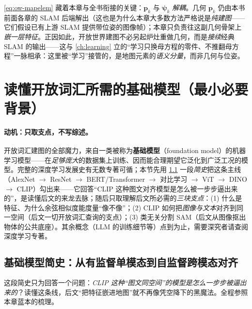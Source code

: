 \begin{insight}
\cref{eq:ow-mapelem} 藏着本章与全书衔接的关键：$\mathbf{p}_k$ 与 $\boldsymbol\psi_k$ \emph{解耦}。几何 $\mathbf{p}_k$ 仍由本书前面各章的 SLAM 后端解出（这也是为什么本章大多数方法严格说是\emph{纯建图}——它们假设已有上游 SLAM 提供带位姿的图像帧）；本章只负责往这副几何骨架上\emph{嵌一层特征}。正因如此，开放世界建图不必另起炉灶重做几何，而是\emph{接续}经典 SLAM 的输出——这与 \cref{ch:learning} 立的“学习只换母方程的零件、不推翻母方程”一脉相承：这里被“学习”接管的，是地图元素的\emph{语义分量}，而非几何与位姿。
\end{insight}

\section{读懂开放词汇所需的基础模型（最小必要背景）}
\label{sec:openworld-fm}

\paragraph{动机：只取支点，不写综述。}
开放词汇建图的全部魔力，来自一类被称为\textbf{基础模型}（foundation model）的机器学习模型——在\emph{足够庞大}的数据集上训练、因而能合理期望它泛化到广泛工况的模型\cite{paull2026openworld}。完整的深度学习发展史有无数专著可循；本节先用 \cref{sec:openworld-fmhistory} 一段\emph{简史}把这条主线（AlexNet $\to$ ResNet $\to$ BERT/Transformer $\to$ 对比学习 $\to$ ViT $\to$ DINO $\to$ CLIP）勾出来——它回答“CLIP 这种图文对齐模型是怎么被一步步逼出来的”，是读懂后文的来龙去脉；随后只取理解后文所必需的\emph{三块支点}：(1) 什么是特征、为什么余弦相似度能度量“像不像”；(2) CLIP 如何把\emph{图像与文本}对齐到同一空间（后文一切开放词汇查询的支点）；(3) 类无关分割 SAM（后文从图像抠出物体的公共底座）。其余概念（LLM 的训练细节等）点到为止，需要深究者请查阅深度学习专著\cite{goodfellow2016deeplearning}。

\subsection{基础模型简史：从有监督单模态到自监督跨模态对齐}
\label{sec:openworld-fmhistory}

这段简史只为回答一个问题：\emph{CLIP 这种“图文同空间”的模型是怎么一步步被逼出来的}？读懂这条线，后文“把特征嵌进地图”就不再像凭空降下的黑魔法。全程参照本章蓝本的梳理\cite{paull2026openworld}。

